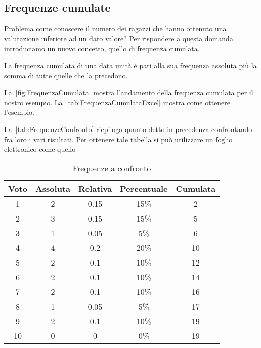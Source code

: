 \subsection{Frequenze cumulate}
Problema come conoscere il numero dei ragazzi che hanno ottenuto una valutazione inferiore ad un dato valore? Per rispondere a questa domanda introduciamo un nuovo concetto, quello di frequenza cumulata.
\begin{defn}
	La frequenza cumulata di una data unità è pari alla sua frequenza assoluta più la somma di tutte quelle che la  precedono.
\end{defn}
La~\vref*{fig:FrequenzaCumulata} mostra l'andamento della frequenza cumulata per il nostro esempio. La~\vref{tab:FrequenzaCumulataExcel} mostra come ottenere l'esempio.

La~\vref{tab:FrequenzeConfronto} riepiloga quanto detto in precedenza confrontando fra loro i vari risultati. Per ottenere tale tabella si può utilizzare un foglio elettronico come quello~
\begin{table}[!t]
	\centering
 	 \begin{tabular} {*{2} {S[table-format=1.0]}S[table-format=1.2]*{2} {S[table-format=2.0]} }%
 	 	\toprule
 	 	{Voto}  & {Assoluta} & {Relativa} & {Percentuale} &{Cumulata} \\
 	 		& 2 & 0.15 & 15\% & 2  \\ 
 	 	2	& 3 & 0.15 & 15\% & 5 \\ 
 	 	3	& 1 & 0.05 & 5\% & 6 \\ 
 	 	4	& 4 & 0.2 & 20\% & 10 \\ 
 	 	5	& 2 & 0.1 & 10\% & 12 \\ 
 	 	6 	& 2 & 0.1 & 10\% & 14 \\ 
 	 	7	& 2 & 0.1 & 10\% & 16 \\ 
 	 	8	& 1 & 0.05 & 5\% & 17 \\ 
 	 	9	& 2 & 0.1 & 10\% & 19 \\ 
 	 	10	& 0 & 0 & 0\% & 19 \\ 
 	 	\bottomrule
 	 \end{tabular}
 	\caption{Frequenze a confronto}
 	\label{tab:FrequenzeConfronto}
 \end{table}

 